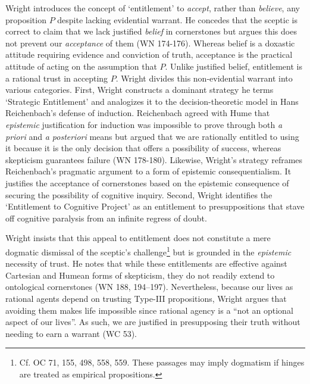 Wright introduces the concept of `entitlement' to \emph{accept}, rather
than \emph{believe}, any proposition $P$ despite lacking evidential
warrant. He concedes that the sceptic is correct to claim that we lack
justified \emph{belief} in cornerstones but argues this does not prevent
our \emph{acceptance} of them (WN 174-176). Whereas belief is a doxastic
attitude requiring evidence and conviction of truth, acceptance is the
practical attitude of acting on the assumption that $P$. Unlike justified
belief, entitlement is a rational trust in accepting $P$. Wright divides
this non-evidential warrant into various categories. First, Wright
constructs a dominant strategy he terms `Strategic Entitlement' and
analogizes it to the decision-theoretic model in Hans Reichenbach's
defense of induction. Reichenbach agreed with Hume that \emph{epistemic}
justification for induction was impossible to prove through both \emph{a
priori} and \emph{a posteriori} means but argued that we are rationally
entitled to using it because it is the only decision that offers a
possibility of success, whereas skepticism guarantees failure (WN
178-180). Likewise, Wright's strategy reframes Reichenbach's pragmatic
argument to a form of epistemic consequentialism. It justifies the
acceptance of cornerstones based on the epistemic consequence of
securing the possibility of cognitive inquiry. Second, Wright identifies
the `Entitlement to Cognitive Project' as an entitlement to
presuppositions that stave off cognitive paralysis from an infinite
regress of doubt.

Wright insists that this appeal to entitlement does not constitute a
mere dogmatic dismissal of the sceptic's challenge\footnote{Cf. OC 71,
  155, 498, 558, 559. These passages may imply dogmatism if hinges are
  treated as empirical propositions.} but is grounded in the
\emph{epistemic} necessity of trust. He notes that while these
entitlements are effective against Cartesian and Humean forms of
skepticism, they do not readily extend to ontological cornerstones (WN
188, 194--197). Nevertheless, because our lives as rational agents depend
on trusting Type-III propositions, Wright argues that avoiding them
makes life impossible since rational agency is a ``not an optional
aspect of our lives''. As such, we are justified in presupposing their
truth without needing to earn a warrant (WC 53).


